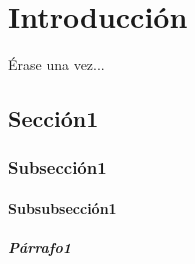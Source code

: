 \chapter{Introducción} \label{cap.introduccion}
Érase una vez... \cite{Nobody06}
\section{Sección1}
\blindtext[3]
\subsection{Subsección1}
\blindtext[3]
\subsubsection{Subsubsección1}
\blindtext[10]
\paragraph{Párrafo1}
\blindtext[3]
